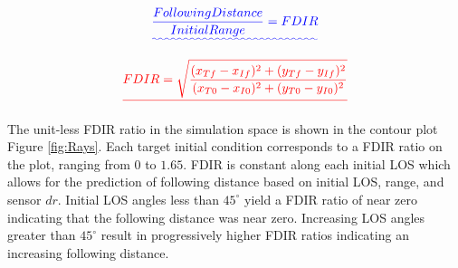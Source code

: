 \documentclass[conference]{IEEEtran}
\providecommand{\DIFadd}[1]{{\protect\color{blue}\uwave{#1}}} %
\providecommand{\DIFdel}[1]{{\protect\color{red}\sout{#1}}}                      %
\providecommand{\DIFaddbegin}{} %
\providecommand{\DIFaddend}{} %
\providecommand{\DIFdelbegin}{} %
\providecommand{\DIFdelend}{} %
\newcommand{\DIFscaledelfig}{0.5}
\newlength{\DIFdelgraphicswidth} %
\newlength{\DIFdelgraphicsheight} %
\newcommand{\DIFaddincludegraphics}[2][]{{\color{blue}\fbox{\DIFOincludegraphics[#1]{#2}}}} %
\newcommand{\DIFdelincludegraphics}[2][]{%
\sbox{\DIFdelgraphicsbox}{\DIFOincludegraphics[#1]{#2}}%
\settoboxwidth{\DIFdelgraphicswidth}{\DIFdelgraphicsbox} %
\settoboxtotalheight{\DIFdelgraphicsheight}{\DIFdelgraphicsbox} %
\scalebox{\DIFscaledelfig}{%
\parbox[b]{\DIFdelgraphicswidth}{\usebox{\DIFdelgraphicsbox}\\[-\baselineskip] \rule{\DIFdelgraphicswidth}{0em}}\llap{\resizebox{\DIFdelgraphicswidth}{\DIFdelgraphicsheight}{%
\setlength{\unitlength}{\DIFdelgraphicswidth}%
\begin{picture}(1,1)%
\thicklines\linethickness{2pt} %
{\color[rgb]{1,0,0}\put(0,0){\framebox(1,1){}}}%
{\color[rgb]{1,0,0}\put(0,0){\line( 1,1){1}}}%
{\color[rgb]{1,0,0}\put(0,1){\line(1,-1){1}}}%
\end{picture}%
}\hspace*{3pt}}} %
} %
\DeclareRobustCommand{\DIFaddbegin}{\DIFOaddbegin \let\includegraphics\DIFaddincludegraphics} %
\DeclareRobustCommand{\DIFaddend}{\DIFOaddend \let\includegraphics\DIFOincludegraphics} %
\DeclareRobustCommand{\DIFdelbegin}{\DIFOdelbegin \let\includegraphics\DIFdelincludegraphics} %
\DeclareRobustCommand{\DIFdelend}{\DIFOaddend \let\includegraphics\DIFOincludegraphics} %
\begin{document}



\DIFaddbegin \begin{equation} 
\DIFadd{\label{eq:FDIR}
\frac{Following Distance}{Initial Range} = FDIR
}\end{equation}
\DIFaddend 

\DIFdelbegin \begin{displaymath} 
\DIFdel{%
FDIR = \sqrt{\frac{(x_{Tf}-x_{If})^2+(y_{Tf}-y_{If})^2}{(x_{T0}-x_{I0})^2+(y_{T0}-y_{I0})^2}}
}\end{displaymath}

\DIFdelend The unit-less FDIR ratio in the simulation space is shown in the contour plot Figure \ref{fig:Rays}. Each target initial condition corresponds to a FDIR ratio on the plot, ranging from $0$ to $1.65$. FDIR is constant along each initial LOS which allows for the prediction of following distance based on initial LOS, range, and sensor $dr$. Initial LOS angles less than $45^{\circ}$ yield a FDIR ratio of near zero indicating that the following distance was near zero. Increasing LOS angles greater than $45^{\circ}$ result in progressively higher FDIR ratios indicating an increasing following distance.
\end{document}
